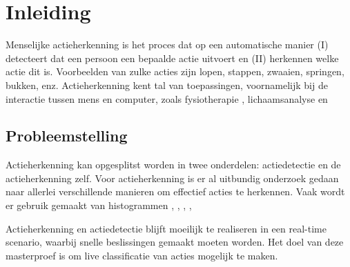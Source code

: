 \setcounter{page}{1}
\chapter{Inleiding}
\label{ch:Inleiding}
Menselijke actieherkenning is het proces dat op een automatische manier (I) detecteert dat een persoon een bepaalde actie uitvoert en (II) herkennen welke actie dit is. Voorbeelden van zulke acties zijn lopen, stappen, zwaaien, springen, bukken, enz. Actieherkenning kent tal van toepassingen, voornamelijk bij de interactie tussen mens en computer, zoals fysiotherapie \cite{Deboeverie2017}, lichaamsanalyse \cite{Devi2015} en 





\section{Probleemstelling}
Actieherkenning kan opgesplitst worden in twee onderdelen: actiedetectie en de actieherkenning zelf. Voor actieherkenning is er al uitbundig onderzoek gedaan naar allerlei verschillende manieren om effectief acties te herkennen. Vaak wordt er gebruik gemaakt van histogrammen \cite{Xia2012},
\cite{Chen2017},
\cite{Vezzani2010},
\cite{Mendoza2007}, 


Actieherkenning en actiedetectie blijft moeilijk te realiseren in een real-time scenario, waarbij snelle beslissingen gemaakt moeten worden. Het doel van deze masterproef is om live classificatie van acties mogelijk te maken. 



